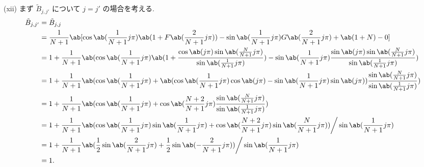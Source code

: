 \documentclass[uplatex,dvipdfmx,a4paper,11pt]{jlreq}
\numberwithin{equation}{section}
\theoremstyle{definition}
\begin{document}
(xii) まず $\tilde{B}_{j,j'}$ について $j = j'$ の場合を考える.
\begin{align}
  \tilde{B}_{j,j'} & = \tilde{B}_{j,j}                                                                                                                                                                                                                            \\
                   & = \frac{1}{N+1}\ab[\cos\ab(\frac{1}{N+1}j\pi)\ab(1 + F\ab(\frac{2}{N+1}j\pi)) - \sin\ab(\frac{1}{N+1}j\pi)G\ab(\frac{2}{N+1}j\pi) + \ab(1 + N) - 0]                                                                                          \\
                   & = 1 + \frac{1}{N+1}\ab(\cos\ab(\frac{1}{N+1}j\pi)\ab(1 + \frac{\cos\ab(j\pi)\sin\ab(\frac{N}{N+1}j\pi)}{\sin\ab(\frac{1}{N+1}j\pi)}) - \sin\ab(\frac{1}{N+1}j\pi)\frac{\sin\ab(j\pi)\sin\ab(\frac{N}{N+1}j\pi)}{\sin\ab(\frac{1}{N+1}j\pi)}) \\
                   & = 1 + \frac{1}{N+1}\ab(\cos\ab(\frac{1}{N+1}j\pi) + \ab(\cos\ab(\frac{1}{N+1}j\pi)\cos\ab(j\pi) - \sin\ab(\frac{1}{N+1}j\pi)\sin\ab(j\pi))\frac{\sin\ab(\frac{N}{N+1}j\pi)}{\sin\ab(\frac{1}{N+1}j\pi)})                                     \\
                   & = 1 + \frac{1}{N+1}\ab(\cos\ab(\frac{1}{N+1}j\pi) + \cos\ab(\frac{N+2}{N+1}j\pi)\frac{\sin\ab(\frac{N}{N+1}j\pi)}{\sin\ab(\frac{1}{N+1}j\pi)})                                                                                               \\
                   & = 1 + \frac{1}{N+1}\ab(\cos\ab(\frac{1}{N+1}j\pi)\sin\ab(\frac{1}{N+1}j\pi) + \cos\ab(\frac{N+2}{N+1}j\pi)\sin\ab(\frac{N}{N+1}j\pi))\bigg/\sin\ab(\frac{1}{N+1}j\pi)                                                                        \\
                   & = 1 + \frac{1}{N+1}\ab(\frac{1}{2}\sin\ab(\frac{2}{N+1}j\pi) + \frac{1}{2}\sin\ab(-\frac{2}{N+1}j\pi))\bigg/\sin\ab(\frac{1}{N+1}j\pi)                                                                                                       \\
                   & = 1.
\end{align}
\end{document}
